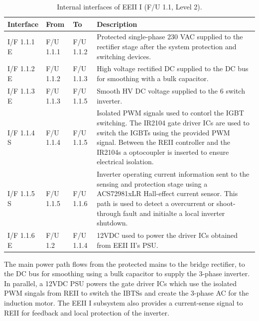 \begin{table}[H]
    \centering
    \caption{Internal interfaces of EEII I (F/U 1.1, Level 2).}
    \label{tab2:interfaces-eeri1}

    \begin{tabularx}{\textwidth}{@{} l l l X @{}}
        \toprule
        \textbf{Interface} & \textbf{From} & \textbf{To} & \textbf{Description} \\
        \midrule

        I/F 1.1.1 E & F/U 1.1.1 & F/U 1.1.2 &
        Protected single-phase 230 VAC supplied to the rectifier stage after the system protection and switching
        devices.\\

        I/F 1.1.2 E & F/U 1.1.2 & F/U 1.1.3 &
        High voltage rectified DC supplied to the DC bus for smoothing with a bulk capacitor.\\

        I/F 1.1.3 E & F/U 1.1.3 & F/U 1.1.5 &
        Smooth HV DC voltage supplied to the 6 switch inverter.\\

        I/F 1.1.4 S & F/U 1.1.4 & F/U 1.1.5 &
        Isolated PWM signals used to contorl the IGBT switching. The IR2104 gate driver ICs are used to switch
        the IGBTs using the provided PWM signal. Between the REII controller and the IR2104s a optocoupler is 
        inserted to ensure electrical isolation.\\

        I/F 1.1.5 S & F/U 1.1.5 & F/U 1.1.6 &
        Inverter operating current information sent to the sensing and protection stage using a 
        ACS72981xLR Hall-effect current sensor. This path is used to detect a overcurrent or shoot-through fault 
        and initialte a local inverter shutdown.\\

        I/F 1.1.6 E & F/U 1.2 & F/U 1.1.4 &
        12VDC used to power the driver ICs obtained from EEII II's PSU. \\

        \bottomrule
    \end{tabularx}
\end{table}

The main power path flows from the protected mains to the bridge rectifier, to the DC bus for smoothing using a bulk
capacitor to supply the 3-phase inverter. In parallel, a 12VDC PSU powers the gate driver ICs which use the isolated 
PWM singals from REII to switch the IBTSs and create the 3-phase AC for the induction motor. The EEII I subsystem
also provides a current-sense signal to REII for feedback and local protection of the inverter. 

